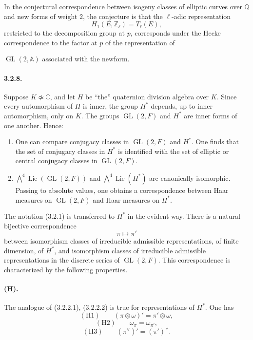 \documentclass[10pt,a4paper]{article}
\providecommand{\GL}{\operatorname{GL}}
\providecommand{\Lie}{\operatorname{Lie}}
\providecommand{\Q}{\mathbb Q}
\providecommand{\Z}{\mathbb Z}
\providecommand{\C}{\mathbb C}
\providecommand{\A}{\mathbb A}
\begin{document}
In the conjectural correspondence between isogeny classes of elliptic curves over \(\Q\) and new forms of weight \(2\), the conjecture is that the \(\ell\)-adic representation
\[
H_1(E,\Z_\ell)=T_\ell(E),
\]
restricted to the decomposition group at \(p\), corresponds under the Hecke correspondence to the factor at \(p\) of the representation of

\clearpage
{}
\hypertarget{authority-48}{}
\(\GL(2,\A)\) associated with the newform.

\paragraph{3.2.8.} Suppose \(K\not\simeq\C\), and let \(H\) be ``the'' quaternion division algebra over \(K\). Since every automorphism of \(H\) is inner, the group \(H^*\) depends, up to inner automorphism, only on \(K\). The groups \(\GL(2,F)\) and \(H^*\) are inner forms of one another. Hence:

\begin{enumerate}[label=(\alph*)]
\item One can compare conjugacy classes in \(\GL(2,F)\) and \(H^*\). One finds that the set of conjugacy classes in \(H^*\) is identified with the set of elliptic or central conjugacy classes in \(\GL(2,F)\).
\item \(\bigwedge^4\Lie(\GL(2,F))\) and \(\bigwedge^4\Lie(H^*)\) are canonically isomorphic. Passing to absolute values, one obtains a correspondence between Haar measures on \(\GL(2,F)\) and Haar measures on \(H^*\).
\end{enumerate}
The notation (3.2.1) is transferred to \(H^*\) in the evident way. There is a natural bijective correspondence
\[
\pi\longmapsto \pi'
\]
between isomorphism classes of irreducible admissible representations, of finite dimension, of \(H^*\), and isomorphism classes of irreducible admissible representations in the discrete series of \(\GL(2,F)\). This correspondence is characterized by the following properties.

\paragraph{(H).} The analogue of (3.2.2.1), (3.2.2.2) is true for representations of \(H^*\). One has
\[
\mathrm{(H1)}\qquad (\pi\otimes\omega)'=\pi'\otimes\omega,
\]
\[
\mathrm{(H2)}\qquad \omega_\pi=\omega_{\pi'},
\]
\[
\mathrm{(H3)}\qquad (\pi^\vee)'=(\pi')^\vee.
\]
\end{document}
